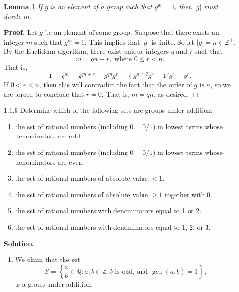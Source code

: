 \documentclass[9pt]{article}
\newcommand{\qed}{\hfill \ensuremath{\Box}}
\newcommand{\Z}{\mathbb{Z}}
\newcommand{\Q}{\mathbb{Q}}
\begin{document}
\begin{enumerate}
   \item[]        \textbf{Lemma 1} \textit{If $g$ is an element of a group
                  such that $g^m = 1$, then $|g|$ must divide $m$.}

                  \textbf{Proof.} Let $g$ be an element of some group. Suppose
                  that there exists an integer $m$ such that $g^m = 1$. This
                  implies that $|g|$ is finite. So let $|g| = n \in \Z^+$. By
                  the Euclidean algorithm, there exist unique integers $q$ and
                  $r$ such that
                  $$m = qn + r, \text{ where } 0 \le r < n.$$
                  That is,
                  $$1 = g^m = g^{qn + r} = g^{qn}g^r = (g^n)^qg^r =1^qg^r=g^r.$$
                  If $0 < r < n$, then this will contradict the fact that the
                  order of $g$ is $n$, so we are forced to conclude that
                  $r = 0$. That is, $m = qn$, as desired. \qed
   \item[1.1.6]   Determine which of the following sets are groups under
                  addition:
                  \begin{enumerate}
                     \item the set of rational numbers (including $0 = 0/1$) in
                           lowest terms whose denominators are odd.
                     \item the set of rational numbers (including $0 = 0/1$) in
                           lowest terms whose denominators are even.
                     \item the set of rational numbers of absolute value $< 1$.
                     \item the set of rational numbers of absolute value $\ge 1$
                           together with 0.
                     \item the set of rational numbers with denominators equal
                           to 1 or 2.
                     \item the set of rational numbers with denominators equal
                           to 1, 2, or 3.
                  \end{enumerate}

      \textbf{Solution.}

      \begin{enumerate}
         \item We claim that the set
               $$S = \left\{\frac{a}{b} \in \Q : a, b \in \Z, b \text{ is odd,} 
                        \text{ and } \gcd(a, b) = 1\right\},$$
               is a group under addition.


\end{enumerate}
\end{enumerate}
\end{document}
